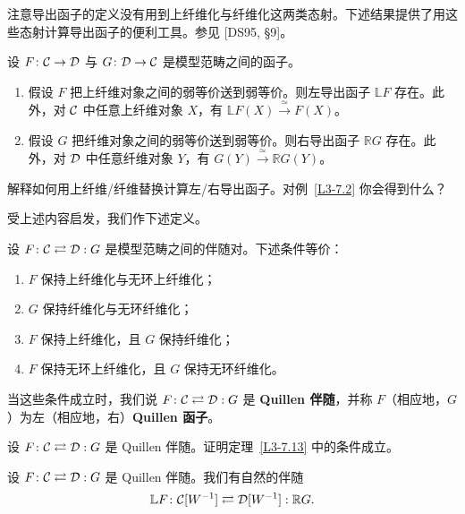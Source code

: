 \nitem\label{L3-7.12}
注意导出函子的定义没有用到上纤维化与纤维化这两类态射。下述结果提供了用这些态射计算导出函子的便利工具。参见 [DS95, §9]。

\begin{theorem}\label{L3-7.13}
设 $F\colon\mathcal{C}\to\mathcal{D}$ 与 $G\colon\mathcal{D}\to\mathcal{C}$ 是模型范畴之间的函子。
\begin{enumerate}[label=(\arabic*),leftmargin=2.4em,itemsep=0.1em]
\item 假设 $F$ 把上纤维对象之间的弱等价送到弱等价。则左导出函子 $\mathbb{L}F$ 存在。此外，对 $\mathcal{C}$ 中任意上纤维对象 $X$，有 $\mathbb{L}F(X)\xrightarrow{\ \simeq\ }F(X)$。
\item 假设 $G$ 把纤维对象之间的弱等价送到弱等价。则右导出函子 $\mathbb{R}G$ 存在。此外，对 $\mathcal{D}$ 中任意纤维对象 $Y$，有 $G(Y)\xrightarrow{\ \simeq\ }\mathbb{R}G(Y)$。
\end{enumerate}
\end{theorem}

\begin{exercise}\label{L3-7.14}
解释如何用上纤维/纤维替换计算左/右导出函子。对例~\ref{L3-7.2} 你会得到什么？
\end{exercise}

\nitem\label{L3-7.15}
受上述内容启发，我们作下述定义。

\begin{proposition}\label{L3-7.16}
设 $F\colon\mathcal{C}\rightleftarrows\mathcal{D}:G$ 是模型范畴之间的伴随对。下述条件等价：
\begin{enumerate}[label=(\roman*),leftmargin=2.4em,itemsep=0.1em]
\item $F$ 保持上纤维化与无环上纤维化；
\item $G$ 保持纤维化与无环纤维化；
\item $F$ 保持上纤维化，且 $G$ 保持纤维化；
\item $F$ 保持无环上纤维化，且 $G$ 保持无环纤维化。
\end{enumerate}
当这些条件成立时，我们说 $F\colon\mathcal{C}\rightleftarrows\mathcal{D}:G$ 是 \textbf{Quillen 伴随}，并称 $F$（相应地，$G$）为左（相应地，右）\textbf{Quillen 函子}。
\end{proposition}

\begin{exercise}\label{L3-7.17}
设 $F\colon\mathcal{C}\rightleftarrows\mathcal{D}:G$ 是 Quillen 伴随。证明定理~\ref{L3-7.13} 中的条件成立。
\end{exercise}

\begin{proposition}\label{L3-7.18}
设 $F\colon\mathcal{C}\rightleftarrows\mathcal{D}:G$ 是 Quillen 伴随。我们有自然的伴随
\[
\mathbb{L}F\colon\mathcal{C}[W^{-1}]\rightleftarrows\mathcal{D}[W^{-1}]:\mathbb{R}G.
\]
\end{proposition}

